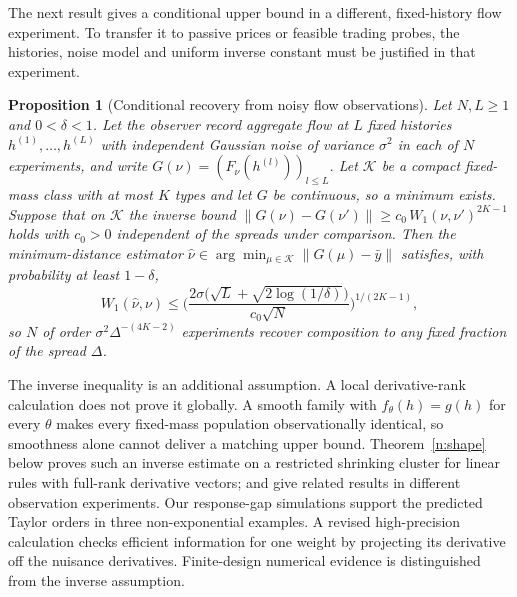 \documentclass[12pt]{article}
\newtheorem{proposition}[theorem]{Proposition}
\theoremstyle{definition}
\theoremstyle{remark}
\begin{document}
The next result gives a conditional upper bound in a different, fixed-history flow experiment. To transfer it to passive prices or feasible trading probes, the histories, noise model and uniform inverse constant must be justified in that experiment.

\begin{proposition}[Conditional recovery from noisy flow observations]\label{n:univup}
Let $N,L\ge1$ and $0<\delta<1$. Let the observer record aggregate flow at $L$ fixed histories $h^{(1)},\ldots,h^{(L)}$ with independent Gaussian noise of variance $\sigma^2$ in each of $N$ experiments, and write $G(\nu)=(F_\nu(h^{(l)}))_{l\le L}$. Let $\mathcal K$ be a compact fixed-mass class with at most $K$ types and let $G$ be continuous, so a minimum exists. Suppose that on $\mathcal K$ the inverse bound $\|G(\nu)-G(\nu')\|\ge c_0\,W_1(\nu,\nu')^{2K-1}$ holds with $c_0>0$ independent of the spreads under comparison. Then the minimum-distance estimator $\hat\nu\in\arg\min_{\mu\in\mathcal K}\|G(\mu)-\bar y\|$ satisfies, with probability at least $1-\delta$,
\[
W_1(\hat\nu,\nu)\le\Big(\frac{2\sigma\big(\sqrt L+\sqrt{2\log(1/\delta)}\big)}{c_0\sqrt N}\Big)^{1/(2K-1)},
\]
so $N$ of order $\sigma^2\Delta^{-(4K-2)}$ experiments recover composition to any fixed fraction of the spread $\Delta$.
\end{proposition}

The inverse inequality is an additional assumption. A local derivative-rank calculation does not prove it globally. A smooth family with $f_\theta(h)=g(h)$ for every $\theta$ makes every fixed-mass population observationally identical, so smoothness alone cannot deliver a matching upper bound. Theorem~\ref{n:shape} below proves such an inverse estimate on a restricted shrinking cluster for linear rules with full-rank derivative vectors; \citet{heinrich2018} and \citet{batenkov2021} give related results in different observation experiments. Our response-gap simulations support the predicted Taylor orders in three non-exponential examples. A revised high-precision calculation checks efficient information for one weight by projecting its derivative off the nuisance derivatives. Finite-design numerical evidence is distinguished from the inverse assumption.
\end{document}
